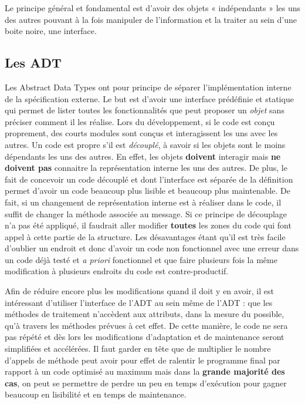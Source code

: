 \documentclass{article}
\begin{document}
	Le principe général et fondamental est d'avoir des objets « indépendants » les uns des autres pouvant à la fois manipuler de l'information et la traiter au sein d'une boite
	noire, une interface.

	\subsection{Les ADT}
		Les Abstract Data Types ont pour principe de séparer l'implémentation interne de la spécification externe. Le but est d'avoir une interface prédéfinie et statique qui permet
		de lister toutes les fonctionnalités que peut proposer un \textit{objet} sans préciser comment il les réalise. Lors du développement, si le code est conçu proprement, des
		courts modules sont conçus et interagissent les uns avec les autres. Un code est propre s'il est \textit{découplé}, à savoir si les objets sont le moins dépendants les
		uns des autres. En effet, les objets \textbf{doivent} interagir mais \textbf{ne doivent pas} connaitre la représentation interne les uns des autres. De plus, le fait de
		concevoir un code découplé et dont l'interface est séparée de la définition permet d'avoir un code beaucoup plus lisible et beaucoup plus maintenable. De fait, si un changement
		de représentation interne est à réaliser dans le code, il suffit de changer la méthode associée au message. Si ce principe de découplage n'a pas été appliqué, il faudrait
		aller modifier \textbf{toutes} les zones du code qui font appel à cette partie de la structure. Les désavantages étant qu'il est très facile d'oublier un endroit et donc d'avoir
		un code non fonctionnel avec une erreur dans un code déjà testé et \textit{a priori} fonctionnel et que faire plusieurs fois la même modification à plusieurs endroits du code est
		contre-productif.

		Afin de réduire encore plus les modifications quand il doit y en avoir, il est intéressant d'utiliser l'interface de l'ADT au sein même de l'ADT : que les méthodes de traitement
		n'accèdent aux attributs, dans la mesure du possible, qu'à travers les méthodes prévues à cet effet. De cette manière, le code ne sera pas répété et dès lors les modifications
		d'adaptation et de maintenance seront simplifiées et accélérées. Il faut garder en tête que de multiplier le nombre d'appels de méthode peut avoir pour effet de ralentir
		le programme final par rapport à un code optimisé au maximum mais dans la \textbf{grande majorité des cas}, on peut se permettre de perdre un peu en temps d'exécution pour gagner
		beaucoup en lisibilité et en temps de maintenance.
\end{document}
